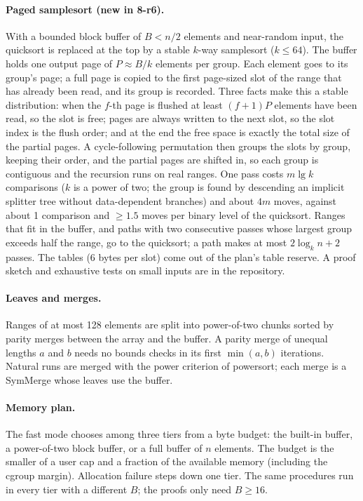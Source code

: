 \documentclass[10pt,a4paper]{article}
\begin{document}
\paragraph{Paged samplesort (new in 8-r6).} With a bounded block buffer of $B<n/2$ elements and
near-random input, the quicksort is replaced at the top by a stable $k$-way samplesort
($k\le64$). The buffer holds one output page of $P\approx B/k$ elements per group. Each element
goes to its group's page; a full page is copied to the first page-sized slot of the range that
has already been read, and its group is recorded. Three facts make this a stable distribution:
when the $f$-th page is flushed at least $(f+1)P$ elements have been read, so the slot is free;
pages are always written to the next slot, so the slot index is the flush order; and at the
end the free space is exactly the total size of the partial pages. A cycle-following
permutation then groups the slots by group, keeping their order, and the partial pages are
shifted in, so each group is contiguous and the recursion runs on real ranges. One pass costs
$m\lg k$ comparisons ($k$ is a power of two; the group is found by descending an implicit
splitter tree without data-dependent branches) and about $4m$ moves, against about 1 comparison and
$\ge1.5$ moves per binary level of the quicksort. Ranges that fit in the buffer, and paths with
two consecutive passes whose largest group exceeds half the range, go to the quicksort; a path
makes at most $2\log_k n+2$ passes. The tables (6 bytes per slot) come out of the plan's table
reserve. A proof sketch and exhaustive tests on small inputs are in the repository.

\paragraph{Leaves and merges.} Ranges of at most 128 elements are split into power-of-two chunks
sorted by parity merges between the array and the buffer. A parity merge of unequal lengths $a$
and $b$ needs no bounds checks in its first $\min(a,b)$ iterations. Natural runs are merged with
the power criterion of powersort; each merge is a SymMerge whose leaves use the buffer.

\paragraph{Memory plan.} The fast mode chooses among three tiers from a byte budget: the
built-in buffer, a power-of-two block buffer, or a full buffer of $n$ elements. The budget is
the smaller of a user cap and a fraction of the available memory (including the cgroup margin).
Allocation failure steps down one tier. The same procedures run in every tier with a different
$B$; the proofs only need $B\ge 16$.
\end{document}
